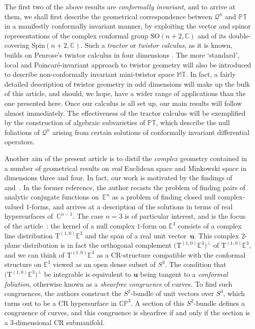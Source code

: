 \documentclass[10pt,a4paper]{amsart}
\numberwithin{equation}{section}
\newcommand{\mc} [1]{\mathcal{#1}}
\newcommand{\Spin} {\mathrm{Spin}}
\newcommand{\SO} {\mathrm{SO}}
\newcommand{\Tgt} {\mathrm{T}}
\newcommand{\PT} {\mathbb{PT}}
\newcommand{\T} {\mathbb{T}}
\newcommand{\E} {\mathbb{E}}
\newcommand{\M} {\mathbb{M}}
\newcommand{\CP} {\mathbb{CP}}
\newcommand{\C} {\mathbb{C}}
\begin{document}
The f\/irst two of the above results are \emph{conformally invariant}, and to arrive at them, we shall f\/irst describe the geometrical correspondence between $\mc{Q}^n$ and $\PT$ in a manifestly conformally invariant manner, by exploiting the vector and spinor representations of the complex conformal group $\SO(n+2,\C)$ and of its double-covering $\Spin(n+2,\C)$. Such a \emph{tractor} or \emph{twistor calculus}, as it is known, builds on Penrose's twistor calculus in four dimensions \cite{Penrose1967}. The more `standard', local and Poincar\'{e}-invariant approach to twistor geometry will also be introduced to describe non-conformally invariant mini-twistor space $\M\T$. In fact, a fairly detailed description of twistor geometry in odd dimensions will make up the bulk of this article, and should, we hope, have a wider range of applications than the one presented here. Once our calculus is all set up, our main results will follow almost immediately. The ef\/fectiveness of the tractor calculus will be exemplif\/ied by the construction of algebraic subvarieties of $\PT$, which describe the null foliations of $\mc{Q}^n$ arising from certain solutions of conformally invariant dif\/ferential operators.

Another aim of the present article is to distil the \emph{complex} geometry contained in a number of geometrical results on \emph{real} Euclidean space and Minkowski space in dimensions three and four. In fact, our work is motivated by the f\/indings of~\cite{Nurowski2010} and~\cite{Baird2013}. In the former reference, the author recasts the problem of f\/inding pairs of analytic conjugate functions on~$\E^n$ as a problem of f\/inding closed null complex-valued $1$-forms, and arrives at a description of the solutions in terms of real hypersurfaces of~$\C^{n-1}$. The case $n=3$ is of particular interest, and is the focus of the article~\cite{Baird2013}: the kernel of a null complex $1$-form on $\E^3$ consists of a complex line distribution $\Tgt^{(1,0)} \E^3$ and the span of a real unit vector~$\bm{u}$. This complex $2$-plane distribution is in fact the orthogonal complement $\big(\Tgt^{(1,0)} \E^3\big)^\perp$ of $\Tgt^{(1,0)} \E^3$, and we can think of $\Tgt^{(1,0)} \E^3 $ as a CR-structure compatible with the conformal structure on $\E^3$ viewed as an open dense subset of $S^3$. The condition that $\big(\Tgt^{(1,0)} \E^3\big)^\perp$ be integrable is equivalent to $\bm{u}$ being tangent to a \emph{conformal foliation}, otherwise known as a \emph{shearfree congruence} of curves. To f\/ind such congruences, the authors construct the $S^2$-bundle of unit vectors over $S^3$, which turns out to be a CR hypersurface in $\CP^3$. A section of this $S^2$-bundle def\/ines a congruence of curves, and this congruence is shearfree if and only if the section is a $3$-dimensional CR submanifold.
\end{document}
